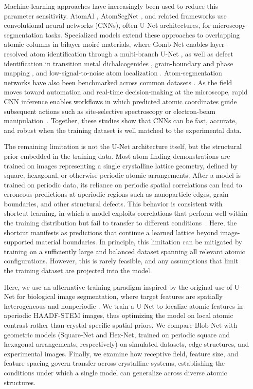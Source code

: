 Machine-learning approaches have increasingly been used to reduce this parameter sensitivity. AtomAI \cite{Ziatdinov2022}, AtomSegNet \cite{Lin2021}, and related frameworks use convolutional neural networks (CNNs), often U-Net architectures, for microscopy segmentation tasks. Specialized models extend these approaches to overlapping atomic columns in bilayer moir\'e materials, where Gomb-Net enables layer-resolved atom identification through a multi-branch U-Net \cite{GombNet2025}, as well as defect identification in transition metal dichalcogenides \cite{Lee2020}, grain-boundary and phase mapping \cite{Vasudevan2018}, and low-signal-to-noise atom localization \cite{Lin2023AtomIDNet,Eliasson2024Localization}. Atom-segmentation networks have also been benchmarked across common datasets \cite{Wei2023Benchmark}. As the field moves toward automation and real-time decision-making at the microscope, rapid CNN inference enables workflows in which predicted atomic coordinates guide subsequent actions such as site-selective spectroscopy or electron-beam manipulation~\cite{Pratiush2024SmartSTEM}. Together, these studies show that CNNs can be fast, accurate, and robust when the training dataset is well matched to the experimental data.

The remaining limitation is not the U-Net architecture itself, but the structural prior embedded in the training data. Most atom-finding demonstrations are trained on images representing a single crystalline lattice geometry, defined by square, hexagonal, or otherwise periodic atomic arrangements. After a model is trained on periodic data, its reliance on periodic spatial correlations can lead to erroneous predictions at aperiodic regions such as nanoparticle edges, grain boundaries, and other structural defects. This behavior is consistent with shortcut learning, in which a model exploits correlations that perform well within the training distribution but fail to transfer to different conditions~\cite{Geirhos2020ShortcutLearning}. Here, the shortcut manifests as predictions that continue a learned lattice beyond image-supported material boundaries. In principle, this limitation can be mitigated by training on a sufficiently large and balanced dataset spanning all relevant atomic configurations. However, this is rarely feasible, and any assumptions that limit the training dataset are projected into the model.

Here, we use an alternative training paradigm inspired by the original use of U-Net for biological image segmentation, where target features are spatially heterogeneous and nonperiodic \cite{Ronneberger2015}. We train a U-Net to localize atomic features in aperiodic HAADF-STEM images, thus optimizing the model on local atomic contrast rather than crystal-specific spatial priors. We compare Blob-Net with geometric models (Square-Net and Hex-Net, trained on periodic square and hexagonal arrangements, respectively) on simulated datasets, edge structures, and experimental images. Finally, we examine how receptive field, feature size, and feature spacing govern transfer across crystalline systems, establishing the conditions under which a single model can generalize across diverse atomic structures.

